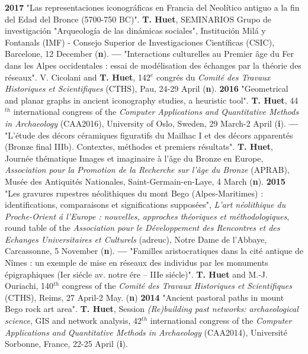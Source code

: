 \documentclass{article}
\begin{document}
\smallbreak
\textbf{2017 }"Las representaciones iconogr\'{a}ficas en Francia del Neol\'{i}tico antiguo a la fin del Edad del Bronce (5700-750 BC)". \textbf{T. Huet}, SEMINARIOS Grupo de investigaci\'{o}n "Arqueolog\'{i}a de las din\'{a}micas sociales", Instituci\'{o}n Mil\'{a} y Fontanals (IMF) - Consejo Superior de Investigaciones Cient\'{i}ficas (CSIC), Barcelone, 12 December (\textbf{n}).
\smallbreak
\textbf{--- } "Interactions culturelles au Premier \^{a}ge du Fer dans les Alpes occidentales : essai de mod\'{e}lisation des \'{e}changes par la th\'{e}orie des r\'{e}seaux". V. Cicolani and \textbf{T. Huet}, 142${}^{e}$ congr\'{e}s du \textit{Comit\'{e} des Travaux Historiques et Scientifiques} (CTHS), Pau, 24-29 April (\textbf{n}).
\smallbreak
\textbf{2016 }"Geometrical and planar graphs in ancient iconography studies, a heuristic tool". \textbf{T. Huet}, 44${}^{th}$ international congress of the \textit{Computer Applications and Quantitative Methods in Archaeology} (CAA2016), University of Oslo, Sweden, 29 March-2 April (\textbf{i}).
\smallbreak
\textbf{--- }"L'\'{e}tude des d\'{e}cors c\'{e}ramiques figuratifs du Mailhac I et des d\'{e}cors apparent\'{e}s (Bronze final IIIb). Contextes, m\'{e}thodes et premiers r\'{e}sultats". \textbf{T. Huet}, Journ\'{e}e th\'{e}matique Images et imaginaire \`{a} l'\^{a}ge du Bronze en Europe, \textit{Association pour la Promotion de la Recherche sur l'\^{a}ge du Bronze} (APRAB), Mus\'{e}e des Antiquit\'{e}s Nationales, Saint-Germain-en-Laye, 4 March (\textbf{n}).
\smallbreak
\textbf{2015 }"Les gravures rupestres n\'{e}olithiques du mont Bego (Alpes-Maritimes) : identifications, comparaisons et significations suppos\'{e}es", \textit{L'art n\'{e}olithique du Proche-Orient \'{a} l'Europe : nouvelles, approches th\'{e}oriques et m\'{e}thodologiques}, round table of the \textit{Association pour le D\'{e}veloppement des Rencontres et des Echanges Universitaires et Culturels} (adreuc), Notre Dame de l'Abbaye, Carcassonne, 5 November (\textbf{n}).
\smallbreak
\textbf{--- }"Familles aristocratiques dans la cit\'{e} antique de N\^{i}mes : un exemple de mise en r\'{e}seaux des individus par les monuments \'{e}pigraphiques (Ier si\'{e}cle av. notre \'{e}re -- IIIe si\'{e}cle)". \textbf{T. Huet} and M.-J. Ouriachi, 140${}^{th}$ congress of the \textit{Comit\'{e} des Travaux Historiques et Scientifiques} (CTHS), Reims, 27 April-2 May. (\textbf{n})
\smallbreak
\textbf{2014 }"Ancient pastoral paths in mount Bego rock art area". \textbf{T. Huet}, Session \textit{(Re)building past networks: archaeological science}, GIS and network analysis, 42${}^{th}$ international congress of the \textit{Computer Applications and Quantitative Methods in Archaeology} (CAA2014), Universit\'{e} Sorbonne, France, 22-25 April (\textbf{i}).
\end{document}
